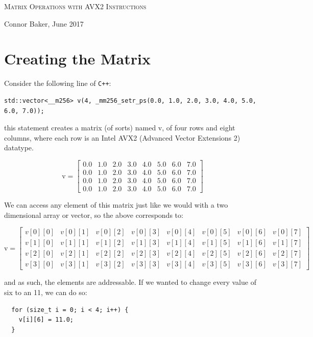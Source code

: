 \documentclass[10pt]{article}
\theoremstyle{definition}
\theoremstyle{plain}
\begin{document}

\begin{center}
  {\Large\textsc{Matrix Operations with AVX2 Instructions}}

  {\large Connor Baker, June 2017}
\end{center}
\section{Creating the Matrix}
Consider the following line of \texttt{C++}:
\begin{verbatim}
std::vector<__m256> v(4, _mm256_setr_ps(0.0, 1.0, 2.0, 3.0, 4.0, 5.0, 6.0, 7.0));
\end{verbatim}
this statement creates a matrix (of sorts) named v, of four rows and eight columns, where each row is an Intel AVX2 (Advanced Vector Extensions 2) datatype.

\[
\text{v} =
\begin{bmatrix}
    0.0 & 1.0 & 2.0 & 3.0 & 4.0 & 5.0 & 6.0 & 7.0 \\
    0.0 & 1.0 & 2.0 & 3.0 & 4.0 & 5.0 & 6.0 & 7.0 \\
    0.0 & 1.0 & 2.0 & 3.0 & 4.0 & 5.0 & 6.0 & 7.0 \\
    0.0 & 1.0 & 2.0 & 3.0 & 4.0 & 5.0 & 6.0 & 7.0
\end{bmatrix}
\]

We can access any element of this matrix just like we would with a two dimensional array or vector, so the above corresponds to:

\[
\text{v} =
\begin{bmatrix}
    v[0][0] & v[0][1] & v[0][2] & v[0][3] & v[0][4] & v[0][5] & v[0][6] & v[0][7] \\
    v[1][0] & v[1][1] & v[1][2] & v[1][3] & v[1][4] & v[1][5] & v[1][6] & v[1][7] \\
    v[2][0] & v[2][1] & v[2][2] & v[2][3] & v[2][4] & v[2][5] & v[2][6] & v[2][7] \\
    v[3][0] & v[3][1] & v[3][2] & v[3][3] & v[3][4] & v[3][5] & v[3][6] & v[3][7]
\end{bmatrix}
\]

\noindent and as such, the elements are addressable. If we wanted to change every value of six to an 11, we can do so:
\begin{verbatim}
  for (size_t i = 0; i < 4; i++) {
    v[i][6] = 11.0;
  }
\end{verbatim}
\end{document}
